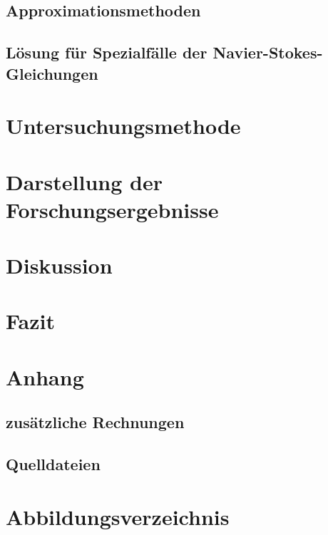 \documentclass[11pt,a4paper]{article}
\theoremstyle{definition}
\numberwithin{equation}{section} %
\begin{document}


\subsection{Approximationsmethoden}



\subsection{Lösung für Spezialfälle der Navier-Stokes-Gleichungen}

\section{Untersuchungsmethode}



\section{Darstellung der Forschungsergebnisse}

\section{Diskussion}

\section{Fazit}

\section{Anhang}

\subsection{zusätzliche Rechnungen}

\label{sec:rechnungen}



\subsection{Quelldateien}

\section{Abbildungsverzeichnis}

\printbibliography
\end{document}
